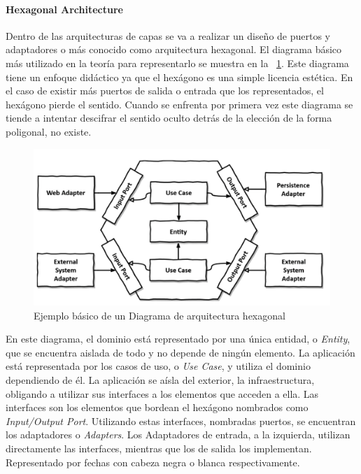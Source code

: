 
\paragraph{Hexagonal Architecture}

Dentro de las arquitecturas de capas se va a realizar un diseño de puertos y adaptadores o más conocido como arquitectura hexagonal.
El diagrama básico más utilizado en la teoría para representarlo se muestra en la ~\cref{fig:hexagonalDiagram}.
Este diagrama tiene un enfoque didáctico ya que el hexágono es una simple licencia estética.
En el caso de existir más puertos de salida o entrada que los representados, el hexágono pierde el sentido.
Cuando se enfrenta por primera vez este diagrama se tiende a intentar descifrar el sentido oculto detrás de la elección de la forma poligonal, no existe.

\begin{figure}[H]
    \centering
    \includegraphics[height=0.22\textheight]{./part/Ejecucion/Seguimiento/CreateTaskUseCase/img/HexagonalDiagram}
    \caption{Ejemplo básico de un Diagrama de arquitectura hexagonal\cite{TomHombergs2019GYHD}}\label{fig:hexagonalDiagram}
\end{figure}

En este diagrama, el dominio está representado por una única entidad, o \textit{Entity}, que se encuentra aislada de todo y no depende de ningún elemento.
La aplicación está representada por los casos de uso, o \textit{Use Case}, y utiliza el dominio dependiendo de él.
La aplicación se aísla del exterior, la infraestructura, obligando a utilizar sus interfaces a los elementos que acceden a ella.
Las interfaces son los elementos que bordean el hexágono nombrados como \textit{Input/Output Port}.
Utilizando estas interfaces, nombradas puertos, se encuentran los adaptadores o \textit{Adapters}.
Los Adaptadores de entrada, a la izquierda, utilizan directamente las interfaces, mientras que los de salida los implementan.
Representado por fechas con cabeza negra o blanca respectivamente.

